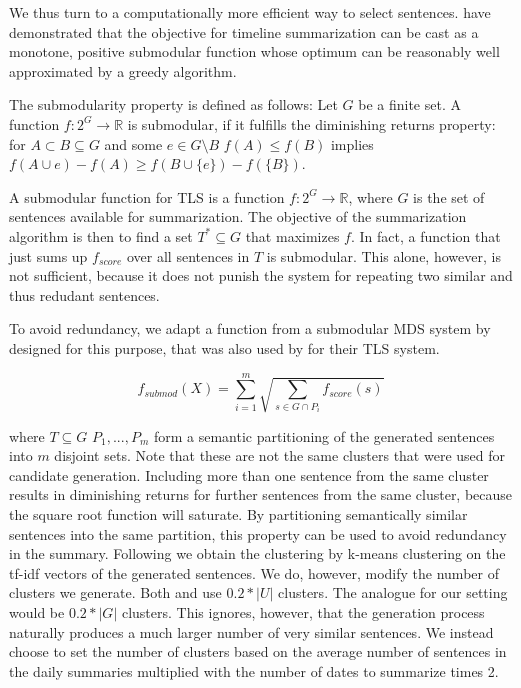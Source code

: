\documentclass[a4paper,BCOR=10mm]{report}
\numberwithin{lemma}{chapter}
\numberwithin{definition}{chapter}
\begin{document}

We thus turn to a computationally more efficient way to select sentences.
\citet{markert} have demonstrated that the objective for timeline summarization can be cast as a monotone, positive submodular function whose optimum can be reasonably well approximated by a greedy algorithm.

The submodularity property is defined as follows:
 Let $G$ be a finite set. A function $f: 2^{G} \rightarrow \mathbb{R}$ is submodular, if it fulfills the diminishing returns property: for $A \subset B \subseteq G$ and some $e \in G \setminus B$ $f(A) \leq f(B)$ implies $f(A \cup e) - f(A) \geq f(B \cup \{e\}) - f(\{B\})$.

A submodular function for TLS is a function $f: 2^{G} \rightarrow \mathbb{R}$, where $G$ is the set of sentences available for summarization.
The objective of the summarization algorithm is then to find a set $T^{*} \subseteq G$ that maximizes $f$.
In fact, a function that just sums up $f_{\mathit{score}}$ over all sentences in $T$ is submodular. This alone, however, is not sufficient, because it does not punish the system for repeating two similar and thus redudant sentences.

To avoid redundancy, we adapt a function from a submodular MDS system by \citet{lin+blimes} designed for this purpose, that was also used by \citet{markert} for their TLS system.

\begin{equation}
f_{\mathit{submod}}(X) = \sum_{i = 1}^{m} \sqrt{\sum_{s \in G \cap P_i} f_{\mathit{score}}(s)}
\end{equation}

where $T \subseteq G$ $P_1, ..., P_m$ form a semantic partitioning of the generated sentences into $m$ disjoint sets. Note that these are not the same clusters that were used for candidate generation. Including more than one sentence from the same cluster results in diminishing returns for further sentences from the same cluster, because the square root function will saturate.
By partitioning semantically similar sentences into the same partition, this property can be used to avoid redundancy in the summary.
Following \citet{lin+blimes} we obtain the clustering by k-means clustering on the tf-idf vectors of the generated sentences. We do, however, modify the number of clusters we generate. Both \citet{lin+blimes} and \citet{markert} use $0.2 * |U|$ clusters. The analogue for our setting would be $0.2 * |G|$ clusters. This ignores, however, that the generation process naturally produces a much larger number of very similar sentences. We instead choose to set the number of clusters based on the average number of sentences in the daily summaries multiplied with the number of dates to summarize times 2.
\end{document}
